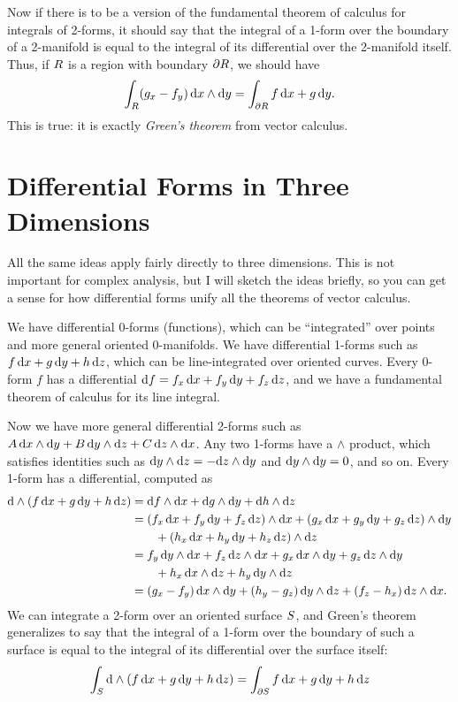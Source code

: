 \documentclass[12pt]{amsart}
\begin{document}
Now if there is to be a version of the fundamental theorem of calculus for integrals of 2-forms, it should say that the integral of a 1-form over the boundary of a 2-manifold is equal to the integral of its differential over the 2-manifold itself.
Thus, if $R$ is a region with boundary $\partial R$, we should have
\[ \int_{R} (g_x - f_y)\, {\mathrm{d} x}\wedge{\ensuremath{\mathrm{d} y}} = \int_{\partial R} f\,{\mathrm{d} x} + g\,{\mathrm{d} y}. \]
This is true: it is exactly \emph{Green's theorem} from vector calculus.

\section{Differential Forms in Three Dimensions}
\label{sec:forms-in-3D}

All the same ideas apply fairly directly to three dimensions.
This is not important for complex analysis, but I will sketch the ideas briefly, so you can get a sense for how differential forms unify all the theorems of vector calculus.

We have differential 0-forms (functions), which can be ``integrated'' over points and more general oriented 0-manifolds.
We have differential 1-forms such as $f\,{\mathrm{d} x} + g\,{\mathrm{d} y} + h\,{\mathrm{d} z}$, which can be line-integrated over oriented curves.
Every 0-form $f$ has a differential ${\mathrm{d} f} = f_x \,{\mathrm{d} x} + f_y\,{\mathrm{d} y} + f_z\,{\mathrm{d} z}$, and we have a fundamental theorem of calculus for its line integral.

Now we have more general differential 2-forms such as $A\,{\mathrm{d} x}\wedge{\ensuremath{\mathrm{d} y}} + B\,{\mathrm{d} y}\wedge{\ensuremath{\mathrm{d} z}} + C \,{\mathrm{d} z}\wedge{\ensuremath{\mathrm{d} x}}$.
Any two 1-forms have a $\wedge$ product, which satisfies identities such as ${\mathrm{d} y}\wedge{\ensuremath{\mathrm{d} z}} = -{\mathrm{d} z}\wedge{\ensuremath{\mathrm{d} y}}$ and ${\mathrm{d} y}\wedge{\ensuremath{\mathrm{d} y}}=0$, and so on.
Every 1-form has a differential, computed as
\begin{align*}
  \mathrm{d}\wedge(f\,{\mathrm{d} x} + g\,{\mathrm{d} y} + h\,{\mathrm{d} z})
  &= {\mathrm{d} f}\wedge{\ensuremath{\mathrm{d} x}} + {\mathrm{d} g}\wedge{\ensuremath{\mathrm{d} y}} + {\mathrm{d} h}\wedge{\ensuremath{\mathrm{d} z}}\\
  &= (f_x \,{\mathrm{d} x} + f_y \,{\mathrm{d} y} + f_z\,{\mathrm{d} z})\wedge{\ensuremath{\mathrm{d} x}} + (g_x \,{\mathrm{d} x} + g_y \,{\mathrm{d} y} + g_z\,{\mathrm{d} z})\wedge{\ensuremath{\mathrm{d} y}}\\
  &\qquad + (h_x \,{\mathrm{d} x} + h_y \,{\mathrm{d} y} + h_z\,{\mathrm{d} z})\wedge{\ensuremath{\mathrm{d} z}}\\
  &= f_y \,{\mathrm{d} y}\wedge{\ensuremath{\mathrm{d} x}} + f_z\,{\mathrm{d} z}\wedge{\ensuremath{\mathrm{d} x}} + g_x \,{\mathrm{d} x}\wedge{\ensuremath{\mathrm{d} y}} + g_z\,{\mathrm{d} z} \wedge{\ensuremath{\mathrm{d} y}} \\
  &\qquad + h_x\,{\mathrm{d} x}\wedge{\ensuremath{\mathrm{d} z}} + h_y \,{\mathrm{d} y}\wedge{\ensuremath{\mathrm{d} z}}\\
  &= (g_x - f_y)\,{\mathrm{d} x}\wedge{\ensuremath{\mathrm{d} y}} + (h_y - g_z) \,{\mathrm{d} y}\wedge{\ensuremath{\mathrm{d} z}} + (f_z - h_x)\,{\mathrm{d} z}\wedge{\ensuremath{\mathrm{d} x}}.
\end{align*}
We can integrate a 2-form over an oriented surface $S$, and Green's theorem generalizes to say that the integral of a 1-form over the boundary of such a surface is equal to the integral of its differential over the surface itself:
\begin{equation}
  \int_{S} \mathrm{d}\wedge(f\,{\mathrm{d} x} + g\,{\mathrm{d} y} + h\,{\mathrm{d} z}) = \int_{\partial S} f\,{\mathrm{d} x} + g\,{\mathrm{d} y} + h\,{\mathrm{d} z}\label{eq:stokes-theorem}
\end{equation}
\end{document}
